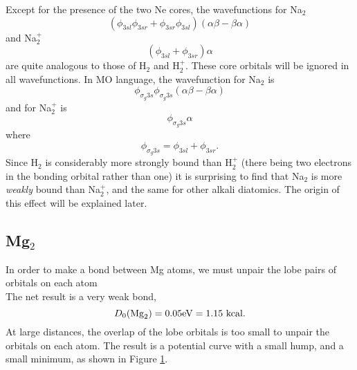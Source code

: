 Except for the presence of the two Ne cores, the wavefunctions for 
Na$_2$
\begin{equation}
\left( \phi_{3sl} \phi_{3sr} + \phi_{3sr} \phi_{3sl} \right) \left( 
\alpha \beta - \beta \alpha \right)
\end{equation}
and Na$^+_2$
\begin{equation}
\left( \phi_{3sl} + \phi_{3sr} \right) \alpha
\end{equation}
are quite analogous to those of H$_2$ and H$_2^+$.  These core 
orbitals will be ignored in all wavefunctions.  In MO 
language, the wavefunction for Na$_2$ is
\begin{equation}
\phi_{\sigma_g 3s} \phi_{\sigma_g3s} ( \alpha \beta - \beta \alpha )
\end{equation}
and for Na$_2^+$ is
\begin{equation}
\phi_{\sigma_g3s}\alpha
\end{equation}
where
\begin{equation}
\phi_{\sigma_g3s} = \phi_{3sl} + \phi_{3sr}.
\end{equation}
Since H$_2$ is considerably more strongly bound than H$^+_2$ (there being two
electrons in the bonding orbital rather than one) it is surprising 
to find that Na$_2$ is more \emph{weakly} bound than Na$^+_2$, and the same for 
other alkali diatomics. The origin of this effect will be explained 
later.

\subsection{Mg$_2$}

In order to make a bond between Mg atoms, we must unpair the lobe 
pairs of orbitals on each atom
\begin{equation}
\end{equation}
The net result is a very weak bond, 
\begin{equation}
D_0 ( {\rm Mg}_2) = 0.05 {\rm eV} = 1.15~{\rm kcal}.
\end{equation}
At large distances, the overlap of the lobe orbitals is too small to unpair 
the orbitals on each atom.  The result is a potential curve with a small 
hump, and a small minimum, as shown in Figure \ref{chap10-fig4}.

\begin{figure}
\caption{}
\label{chap10-fig4}
\end{figure}

